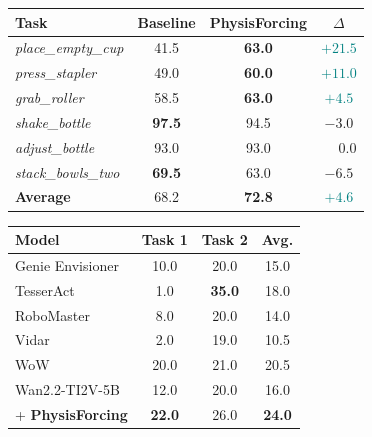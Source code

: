 \begin{figure}[t]
\centering
\footnotesize
\setlength{\tabcolsep}{4pt}
\renewcommand{\arraystretch}{1.1}
\begin{minipage}[t]{0.49\linewidth}
\vspace{0pt}
\centering
\begin{minipage}[t][2.6\baselineskip][t]{\linewidth}
\label{tab:robotwin_results}
\end{minipage}
\begin{tabular}{lccc}
\toprule
\textbf{Task} & \textbf{Baseline} & \textbf{PhysisForcing} & $\Delta$ \\
\midrule
\textit{place\_empty\_cup}  & 41.5 & \textbf{63.0} & \textcolor{teal}{$+21.5$} \\
\textit{press\_stapler}     & 49.0 & \textbf{60.0} & \textcolor{teal}{$+11.0$} \\
\textit{grab\_roller}       & 58.5 & \textbf{63.0} & \textcolor{teal}{$+4.5$} \\
\textit{shake\_bottle}      & \textbf{97.5} & 94.5 & $-3.0$ \\
\textit{adjust\_bottle}     & 93.0 & 93.0 & $\phantom{+}0.0$ \\
\textit{stack\_bowls\_two}  & \textbf{69.5} & 63.0 & $-6.5$ \\
\midrule
\textbf{Average}            & 68.2 & \textbf{72.8} & \textcolor{teal}{$+4.6$} \\
\bottomrule
\end{tabular}
\end{minipage}
\hfill
\begin{minipage}[t]{0.49\linewidth}
\vspace{0pt}
\centering
\begin{minipage}[t][2.6\baselineskip][t]{\linewidth}
\label{tab:worldarena}
\end{minipage}
\begin{tabular}{lccc}
\toprule
\textbf{Model} & \textbf{Task 1} & \textbf{Task 2} & \textbf{Avg.} \\
\midrule
Genie Envisioner~\cite{liao2025genie} & 10.0 & 20.0 & 15.0 \\
TesserAct~\cite{zhen2025tesseract} & \phantom{0}1.0 & \textbf{35.0} & 18.0 \\
RoboMaster & \phantom{0}8.0 & 20.0 & 14.0 \\
Vidar~\cite{feng2025vidar} & \phantom{0}2.0 & 19.0 & 10.5 \\
WoW~\cite{chi2025wow} & 20.0 & 21.0 & 20.5 \\
\midrule
Wan2.2-TI2V-5B & 12.0 & 20.0 & 16.0 \\
\quad + \textbf{PhysisForcing} & \textbf{22.0} & 26.0 & \textbf{24.0} \\
\bottomrule
\end{tabular}
\end{minipage}
\end{figure}


